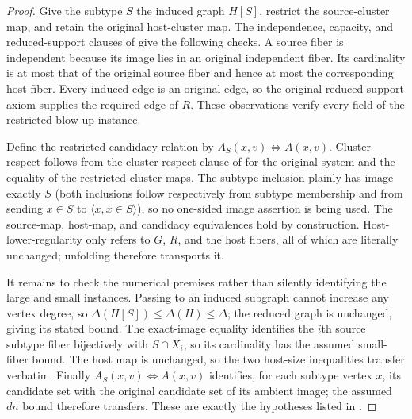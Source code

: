\begin{proof}
Give the subtype $S$ the induced graph $H[S]$, restrict the source-cluster map, and retain the original host-cluster map.  The independence, capacity, and reduced-support clauses of  give the following checks.  A source fiber is independent because its image lies in an original independent fiber.  Its cardinality is at most that of the original source fiber and hence at most the corresponding host fiber.  Every induced edge is an original edge, so the original reduced-support axiom supplies the required edge of $R$.  These observations verify every field of the restricted blow-up instance.

Define the restricted candidacy relation by $A_S(x,v)\iff A(x,v)$.  Cluster-respect follows from the cluster-respect clause of  for the original system and the equality of the restricted cluster maps.  The subtype inclusion plainly has image exactly $S$ (both inclusions follow respectively from subtype membership and from sending $x\in S$ to $\langle x,x\in S\rangle$), so no one-sided image assertion is being used.  The source-map, host-map, and candidacy equivalences hold by construction.  Host-lower-regularity only refers to $G$, $R$, and the host fibers, all of which are literally unchanged; unfolding  therefore transports it.

It remains to check the numerical premises rather than silently identifying the large and small instances.  Passing to an induced subgraph cannot increase any vertex degree, so $\Delta(H[S])\leq\Delta(H)\leq\Delta$; the reduced graph is unchanged, giving its stated bound.  The exact-image equality identifies the $i$th source subtype fiber bijectively with $S\cap X_i$, so its cardinality has the assumed small-fiber bound.  The host map is unchanged, so the two host-size inequalities transfer verbatim.  Finally $A_S(x,v)\iff A(x,v)$ identifies, for each subtype vertex $x$, its candidate set with the original candidate set of its ambient image; the assumed $dn$ bound therefore transfers.  These are exactly the hypotheses listed in .
\end{proof}
